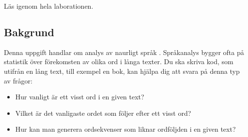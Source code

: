 


\Lab{\LabWeekSEVEN}
\begin{Goals}

\end{Goals}

\begin{Preparations}
\item {}
\item Läs igenom hela laborationen.
\end{Preparations}


\subsection{Bakgrund}

Denna uppgift handlar om analys av naurligt språk . Språkanalys bygger ofta på statistik över förekomsten av olika ord i långa texter. Du ska skriva kod, som utifrån en lång text, till exempel en bok, kan hjälpa dig att svara på denna typ av frågor:
\begin{itemize}[noitemsep]
\item Hur vanligt är ett visst ord i en given text?
\item Vilket är det vanligaste ordet som följer efter ett visst ord?
\item Hur kan man generera ordsekvenser som liknar ordföljden i en given text?
\end{itemize}

